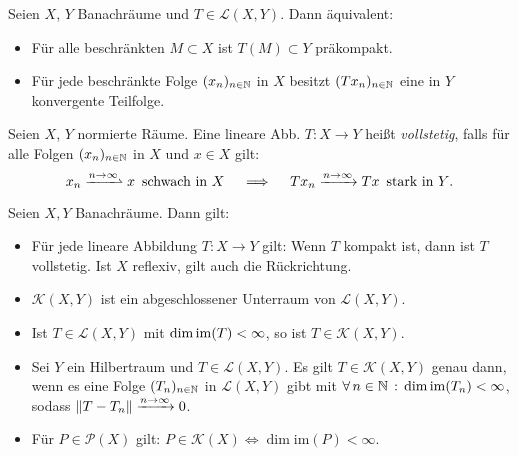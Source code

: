 \documentclass{cheat-sheet}
\newcommand{\LSO}{\mathcal{L}} %
\newcommand{\convWith}[1]{\xrightarrow{#1 \to \infty}} %
\newcommand{\convWeaklyWith}[1]{\xrightharpoonup{#1 \to \infty}} %
\begin{document}
\begin{defn}
  Seien $X$, $Y$ Banachräume und $T \in \LSO(X, Y)$. Dann äquivalent:
  \begin{itemize}
    \item Für alle beschränkten $M \subset X$ ist $T(M) \subset Y$ präkompakt.
    \item Für jede beschränkte Folge $(x_n)_{n \in \mathbb{N}}$ in $X$ besitzt $(T x_n)_{n \in \mathbb{N}}$ eine in $Y$ konvergente Teilfolge.
  \end{itemize}
\end{defn}


\begin{defn}
  Seien $X$, $Y$ normierte Räume. Eine lineare Abb. $T : X \to Y$ heißt \emph{vollstetig}, falls für alle Folgen $(x_n)_{n \in \mathbb{N}}$ in $X$ und $x \in X$ gilt:
  \[
    x_n \convWeaklyWith{n} x \enspace \text{schwach in $X$}
    \quad \implies \quad
    T x_n \convWith{n} T x \enspace \text{stark in $Y$.}
  \]
\end{defn}

\begin{lem}
  Seien $X, Y$ Banachräume. Dann gilt:
  \begin{itemize}
    \item Für jede lineare Abbildung $T : X \to Y$ gilt: Wenn $T$ kompakt ist, dann ist $T$ vollstetig. Ist $X$ reflexiv, gilt auch die Rückrichtung. %
    \item $\mathcal{K}(X, Y)$ ist ein abgeschlossener Unterraum von $\LSO(X, Y)$.
    \item Ist $T \in \LSO(X, Y)$ mit $\dim \mathop{\mathrm{im}}(T) < \infty$, so ist $T \in \mathcal{K}(X, Y)$.
    \item Sei $Y$ ein Hilbertraum und $T \in \LSO(X, Y)$. Es gilt $T \in \mathcal{K}(X, Y)$ genau dann, wenn es eine Folge $(T_n)_{n \in \mathbb{N}}$ in $\LSO(X, Y)$ gibt mit $\forall \, {n \in \mathbb{N}} \,:\, \dim \mathop{\mathrm{im}}(T_n) < \infty$, sodass $\norm{T-T_n} \convWith{n} 0$.
    \item Für $P \in \mathcal{P}(X)$ gilt: $P \in \mathcal{K}(X) \iff \dim \mathrm{im}(P) < \infty$.
  \end{itemize}
\end{lem}

\end{document}
